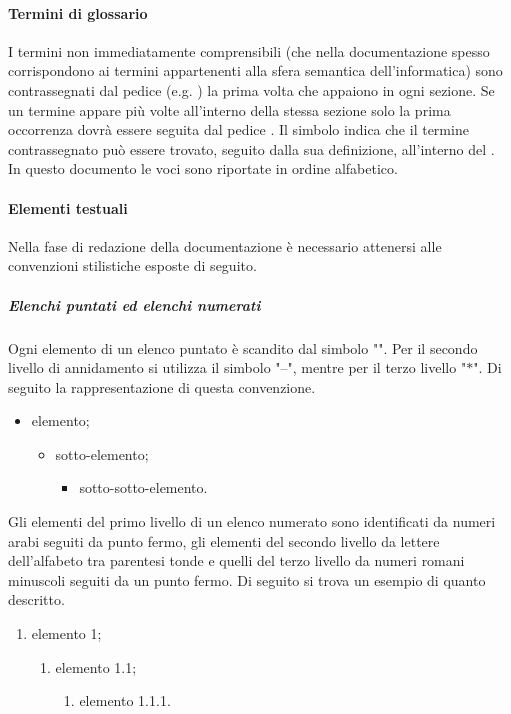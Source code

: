 \paragraph{Termini di glossario}
I termini non immediatamente comprensibili (che nella documentazione spesso corrispondono ai termini appartenenti alla sfera semantica dell'informatica) sono contrassegnati dal pedice \glock{} (e.g. ) la prima volta che appaiono in ogni sezione. Se un termine appare più volte all'interno della stessa sezione solo la prima occorrenza dovrà essere seguita dal pedice \glock{}. Il simbolo indica che il termine contrassegnato può essere trovato, seguito dalla sua definizione, all'interno del . In questo documento le voci sono riportate in ordine alfabetico.  

\paragraph{Elementi testuali}
Nella fase di redazione della documentazione è necessario attenersi alle convenzioni stilistiche esposte di seguito.
\subparagraph{Elenchi puntati ed elenchi numerati}
Ogni elemento di un elenco puntato è scandito dal simbolo "\textbullet". Per il secondo livello di annidamento si utilizza il simbolo "--", mentre per il terzo livello "$\ast$". Di seguito la rappresentazione di questa convenzione.
\begin{itemize}
    \item elemento;
    \begin{itemize}
        \item sotto-elemento;
        \begin{itemize}
            \item sotto-sotto-elemento.
        \end{itemize}
    \end{itemize}
\end{itemize}
Gli elementi del primo livello di un elenco numerato sono identificati da numeri arabi seguiti da punto fermo, gli elementi del secondo livello da lettere dell'alfabeto tra parentesi tonde e quelli del terzo livello da numeri romani minuscoli seguiti da  un punto fermo. Di seguito si trova un esempio di quanto descritto.
\begin{enumerate}
    \item elemento 1;
    \begin{enumerate}
        \item elemento 1.1;
        \begin{enumerate}
            \item elemento 1.1.1.
        \end{enumerate}
    \end{enumerate}
\end{enumerate}
